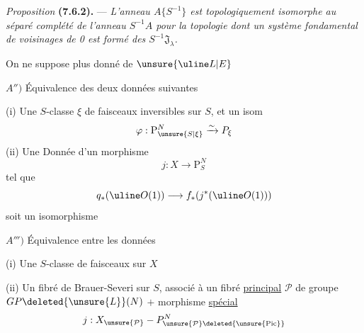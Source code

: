 \textit{Proposition} \textbf{(7.6.2).} --- \textit{L'anneau $A\{S^{-1}\}$ est topologiquement isomorphe au séparé complété de l'anneau $S^{-1}A$ pour la topologie dont un système fondamental de voisinages de 0 est formé des $S^{-1}\mathfrak J_\lambda$.}

On ne suppose plus donné de $\unsure{\uline L|E}$

$A'')$ Équivalence des deux données suivantes

(i) Une $S$-classe $\xi$ de faisceaux inversibles sur $S$, et un isom
\[
\varphi:\mathrm P^N_{\unsure{S|\xi}}\xrightarrow{\sim}P_\xi
\]
(ii) Une Donnée d'un morphisme
\[
j:X\longrightarrow\mathrm P_S^N
\]
tel que 
\[
q_*(\uline O(1))\longrightarrow f_*(j^*(\uline O(1)))
\]
soit un isomorphisme

$A''')$ Équivalence entre les données

(i) Une $S$-classe de faisceaux sur $X$ 

(ii) Un fibré de Brauer-Severi sur $S$, associé à un fibré \uline{principal} $\mathcal P$ de groupe $GP\deleted{\unsure{L}}(N)$
$+$ morphisme \uline{spécial}
\[
j:X_{\unsure{\mathcal P}}-P^N_{\unsure{\mathcal P}\deleted{\unsure{\mathrm{Pic}}}}
\]


